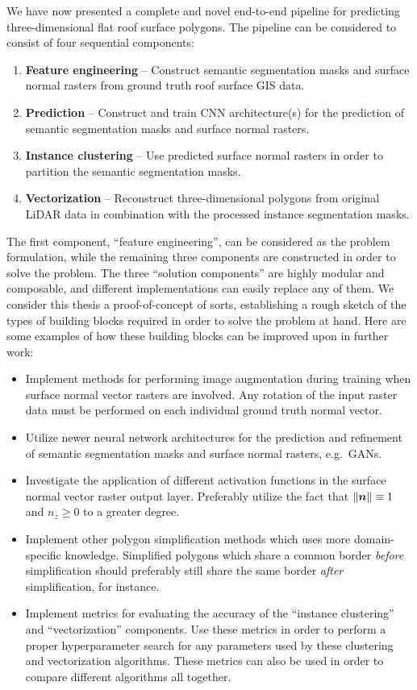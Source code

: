 We have now presented a complete and novel end-to-end pipeline for predicting three-dimensional flat roof surface polygons.
The pipeline can be considered to consist of four sequential components:
%
\begin{enumerate}
  \item \textbf{Feature engineering} -- Construct semantic segmentation masks and surface normal rasters from ground truth roof surface GIS data.
  \item \textbf{Prediction} -- Construct and train CNN architecture(s) for the prediction of semantic segmentation masks and surface normal rasters.
  \item \textbf{Instance clustering} -- Use predicted surface normal rasters in order to partition the semantic segmentation masks.
  \item \textbf{Vectorization} -- Reconstruct three-dimensional polygons from original LiDAR data in combination with the processed instance segmentation masks.
\end{enumerate}
%
The first component, \enquote{feature engineering}, can be considered as the problem formulation, while the remaining three components are constructed in order to solve the problem.
The three \enquote{solution components} are highly modular and composable, and different implementations can easily replace any of them.
We consider this thesis a proof-of-concept of sorts, establishing a rough sketch of the types of building blocks required in order to solve the problem at hand.
Here are some examples of how these building blocks can be improved upon in further work:
%
\newpage
\begin{itemize}
  \item Implement methods for performing image augmentation during training when surface normal vector rasters are involved.
    Any rotation of the input raster data must be performed on each individual ground truth normal vector.
  \item Utilize newer neural network architectures for the prediction and refinement of semantic segmentation masks and surface normal rasters, e.g.\ GANs.
  \item Investigate the application of different activation functions in the surface normal vector raster output layer.
    Preferably utilize the fact that $\left\lVert\boldsymbol{n}\right\rVert \equiv 1$ and $n_z \geq 0$ to a greater degree.
  \item Implement other polygon simplification methods which uses more domain-specific knowledge.
    Simplified polygons which share a common border \emph{before} simplification should preferably still share the same border \emph{after} simplification, for instance.
  \item Implement metrics for evaluating the accuracy of the \enquote{instance clustering} and \enquote{vectorization} components.
    Use these metrics in order to perform a proper hyperparameter search for any parameters used by these clustering and vectorization algorithms.
    These metrics can also be used in order to compare different algorithms all together.
\end{itemize}


